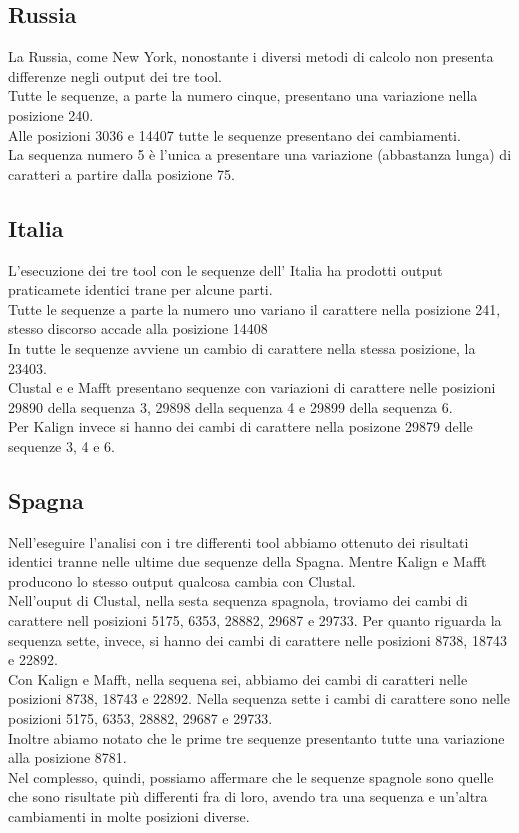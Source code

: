 \documentclass[a4paper,10pt]{article}
\begin{document}
\subsection{Russia}
La Russia, come New York, nonostante i diversi metodi di calcolo non presenta differenze negli output dei tre tool.\\ %
Tutte le sequenze, a parte la numero cinque, presentano una variazione nella posizione 240.\\
Alle posizioni 3036 e 14407 tutte le sequenze presentano dei cambiamenti.\\
La sequenza numero 5 è l'unica a presentare una variazione (abbastanza lunga) di caratteri a partire dalla posizione 75.\\

\subsection{Italia}
L'esecuzione dei tre tool con le sequenze dell' Italia ha prodotti output praticamete identici trane per alcune parti.\\
Tutte le sequenze a parte la numero uno variano il carattere nella posizione 241, stesso discorso accade alla posizione 14408\\
In tutte le sequenze avviene un cambio di carattere nella stessa posizione, la 23403.\\
Clustal e e Mafft presentano sequenze con variazioni di carattere nelle posizioni 29890 della sequenza 3, 29898 della sequenza 4 e 29899 della sequenza 6.\\
Per Kalign invece si hanno dei cambi di carattere nella posizone 29879 delle sequenze 3, 4 e 6.\\

\subsection{Spagna}
Nell'eseguire l'analisi con i tre differenti tool abbiamo ottenuto dei risultati identici tranne nelle ultime due sequenze della Spagna. Mentre Kalign e Mafft producono lo stesso output qualcosa cambia con Clustal.\\
Nell'ouput di Clustal, nella sesta sequenza spagnola, troviamo dei cambi di carattere nell posizioni 5175, 6353, 28882, 29687 e 29733. Per quanto riguarda la sequenza sette, invece, si hanno dei cambi di carattere nelle posizioni 8738, 18743 e 22892.\\
Con Kalign e Mafft, nella sequena sei, abbiamo dei cambi di caratteri nelle posizioni 8738, 18743 e 22892. Nella sequenza sette i cambi di carattere sono nelle posizioni 5175, 6353, 28882, 29687 e 29733.\\
Inoltre abiamo notato che le prime tre sequenze presentanto tutte una variazione alla posizione 8781.\\
Nel complesso, quindi, possiamo affermare che le sequenze spagnole sono quelle che sono risultate più differenti fra di loro, avendo tra una sequenza e un'altra cambiamenti in molte posizioni diverse.\\ %
\end{document}
